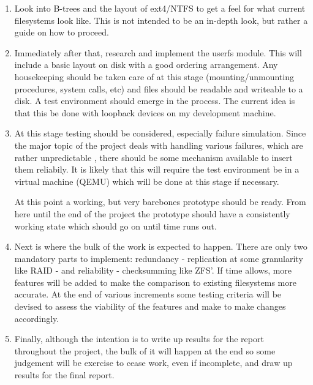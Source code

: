    \begin{enumerate}

        \item Look into B-trees and the layout of ext4/NTFS to get a feel for
            what current filesystems look like. This is not intended to be an
            in-depth look, but rather a guide on how to proceed.

        \item Immediately after that, research and implement the userfs module.
            This will include a basic layout on disk with a good ordering
            arrangement. Any housekeeping should be taken care of at this stage
            (mounting/unmounting procedures, system calls, etc) and files
            should be readable and writeable to a disk. A test environment
            should emerge in the process. The current idea is that this be done
            with loopback devices on my development machine.

        \item At this stage testing should be considered, especially failure
            simulation.  Since the major topic of the project deals with
            handling various failures, which are rather unpredictable
            \cite{google_flash}, there should be some mechanism available to
            insert them reliabily. It is likely that this will require the test
            environment be in a virtual machine (QEMU) which will be done at
            this stage if necessary.

            At this point a working, but very barebones prototype should be
            ready. From here until the end of the project the prototype should
            have a consistently working state which should go on until time
            runs out.

        \item Next is where the bulk of the work is expected to happen. There
            are only two mandatory parts to implement: redundancy  -
            replication at some granularity like RAID - and reliability -
            checksumming like ZFS'. If time allows, more features will be added
            to make the comparison to existing filesystems more accurate. At
            the end of various increments some testing criteria will be devised
            to assess the viability of the features and make to make changes
            accordingly.

        \item Finally, although the intention is to write up results for the
            report throughout the project, the bulk of it will happen at the
            end so some judgement will be exercise to cease work, even if
            incomplete, and draw up results for the final report.

    \label{l1_num}
    \end{enumerate}


